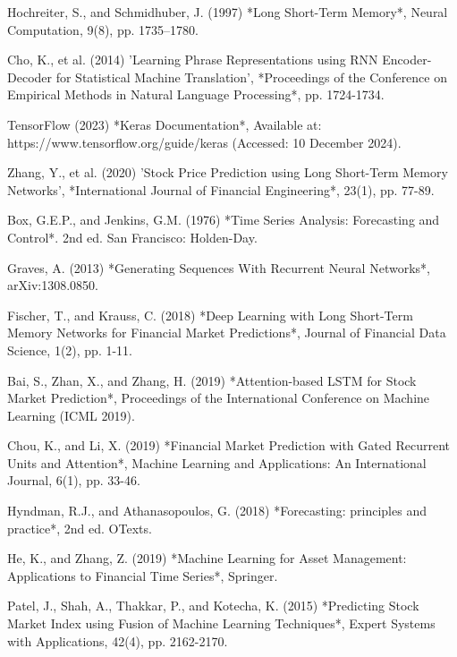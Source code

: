 \documentclass[10pt,twocolumn,a4paper]{article}
\begin{document}
\begin{thebibliography}{9}

Hochreiter, S., and Schmidhuber, J. (1997) *Long Short-Term Memory*, Neural Computation, 9(8), pp. 1735–1780.

Cho, K., et al. (2014) 'Learning Phrase Representations using RNN Encoder-Decoder for Statistical Machine Translation', *Proceedings of the Conference on Empirical Methods in Natural Language Processing*, pp. 1724-1734.

TensorFlow (2023) *Keras Documentation*, Available at: https://www.tensorflow.org/guide/keras (Accessed: 10 December 2024).

Zhang, Y., et al. (2020) 'Stock Price Prediction using Long Short-Term Memory Networks', *International Journal of Financial Engineering*, 23(1), pp. 77-89.

Box, G.E.P., and Jenkins, G.M. (1976) *Time Series Analysis: Forecasting and Control*. 2nd ed. San Francisco: Holden-Day.

Graves, A. (2013) *Generating Sequences With Recurrent Neural Networks*, arXiv:1308.0850.

Fischer, T., and Krauss, C. (2018) *Deep Learning with Long Short-Term Memory Networks for Financial Market Predictions*, Journal of Financial Data Science, 1(2), pp. 1-11.

Bai, S., Zhan, X., and Zhang, H. (2019) *Attention-based LSTM for Stock Market Prediction*, Proceedings of the International Conference on Machine Learning (ICML 2019).

Chou, K., and Li, X. (2019) *Financial Market Prediction with Gated Recurrent Units and Attention*, Machine Learning and Applications: An International Journal, 6(1), pp. 33-46.

Hyndman, R.J., and Athanasopoulos, G. (2018) *Forecasting: principles and practice*, 2nd ed. OTexts.

He, K., and Zhang, Z. (2019) *Machine Learning for Asset Management: Applications to Financial Time Series*, Springer.

Patel, J., Shah, A., Thakkar, P., and Kotecha, K. (2015) *Predicting Stock Market Index using Fusion of Machine Learning Techniques*, Expert Systems with Applications, 42(4), pp. 2162-2170.

\end{thebibliography}
\end{document}
